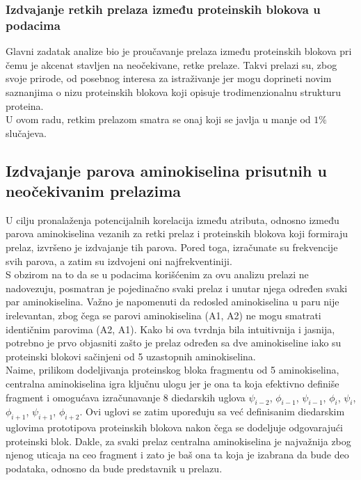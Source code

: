 \documentclass[a4paper,12pt]{article}
\begin{document}
\subsubsection{Izdvajanje retkih prelaza između proteinskih blokova u podacima}
Glavni zadatak analize bio je proučavanje prelaza između proteinskih blokova pri čemu je akcenat stavljen na neočekivane, retke prelaze. Takvi prelazi su, zbog svoje prirode, od posebnog interesa za istraživanje jer mogu doprineti novim saznanjima o nizu proteinskih blokova koji opisuje trodimenzionalnu strukturu proteina. \\
U ovom radu, retkim prelazom smatra se onaj koji se javlja u manje od $1\%$ slučajeva. 
\subsection{Izdvajanje parova aminokiselina prisutnih u neočekivanim prelazima}
U cilju pronalaženja potencijalnih korelacija između atributa, odnosno između parova aminokiselina vezanih za retki prelaz i proteinskih blokova koji formiraju prelaz, izvršeno je izdvajanje tih parova. Pored toga, izračunate su frekvencije svih parova, a zatim su izdvojeni oni najfrekventiniji. \\ 
S obzirom na to da se u podacima korišćenim za ovu analizu prelazi ne nadovezuju, posmatran je pojedinačno svaki prelaz i unutar njega određen svaki par aminokiselina. Važno je napomenuti da redosled aminokiselina u paru nije irelevantan, zbog čega se parovi aminokiselina (A1, A2) ne mogu smatrati identičnim parovima (A2, A1). Kako bi ova tvrdnja bila intuitivnija i jasnija, potrebno je prvo objasniti zašto je prelaz određen sa dve aminokiseline iako su proteinski blokovi sačinjeni od 5 uzastopnih aminokiselina. \\ 
Naime, prilikom dodeljivanja proteinskog bloka fragmentu od 5 aminokiselina, centralna aminokiselina igra ključnu ulogu  jer je ona ta koja efektivno definiše fragment i omogućava izračunavanje 8 diedarskih uglova $\psi_{i-2}$, $\phi_{i-1}$, $\psi_{i-1}$, $\phi_i$, $\psi_i$, $\phi_{i+1}$, $\psi_{i+1}$, $\phi_{i+2}$.  Ovi uglovi se zatim upoređuju sa već definisanim diedarskim uglovima prototipova proteinskih blokova nakon čega se dodeljuje odgovarajući proteinski blok. Dakle, za svaki prelaz centralna aminokiselina je najvažnija zbog njenog uticaja na ceo fragment i zato je baš ona ta koja je izabrana da bude deo podataka, odnosno da bude predstavnik u prelazu. 
\end{document}
